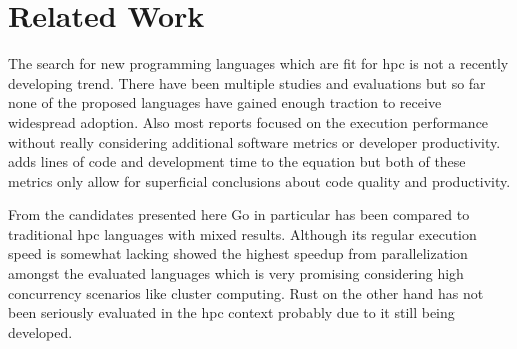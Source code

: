 \section{Related Work}
\label{sec:Concept::Related}

The search for new programming languages which are fit for \gls{hpc} is not a recently developing trend. There have been multiple studies and evaluations but so far none of the proposed languages have gained enough traction to receive widespread adoption. Also most reports focused on the execution performance without really considering additional software metrics or developer productivity. \cite{related_multicore} adds lines of code and development time to the equation but both of these metrics only allow for superficial conclusions about code quality and productivity.

From the candidates presented here Go in particular has been compared to traditional \gls{hpc} languages with mixed results. Although its regular execution speed is somewhat lacking \cite{related_sor_study} showed the highest speedup from parallelization amongst the evaluated languages which is very promising considering high concurrency scenarios like cluster computing. Rust on the other hand has not been seriously evaluated in the \gls{hpc} context probably due to it still being developed.
